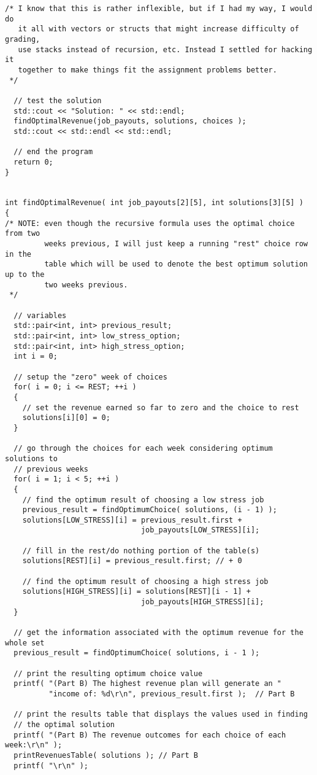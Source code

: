 \documentclass[11pts]{article}
\begin{document}
\begin{enumerate}
\begin{enumerate}
\begin{verbatim}
/* I know that this is rather inflexible, but if I had my way, I would do
   it all with vectors or structs that might increase difficulty of grading,
   use stacks instead of recursion, etc. Instead I settled for hacking it
   together to make things fit the assignment problems better.
 */

  // test the solution
  std::cout << "Solution: " << std::endl;
  findOptimalRevenue(job_payouts, solutions, choices );
  std::cout << std::endl << std::endl;

  // end the program
  return 0;
}


int findOptimalRevenue( int job_payouts[2][5], int solutions[3][5] )
{
/* NOTE: even though the recursive formula uses the optimal choice from two
         weeks previous, I will just keep a running "rest" choice row in the
         table which will be used to denote the best optimum solution up to the
         two weeks previous.
 */

  // variables
  std::pair<int, int> previous_result;
  std::pair<int, int> low_stress_option;
  std::pair<int, int> high_stress_option;
  int i = 0;

  // setup the "zero" week of choices
  for( i = 0; i <= REST; ++i )
  {
    // set the revenue earned so far to zero and the choice to rest
    solutions[i][0] = 0;
  }

  // go through the choices for each week considering optimum solutions to
  // previous weeks
  for( i = 1; i < 5; ++i )
  {
    // find the optimum result of choosing a low stress job
    previous_result = findOptimumChoice( solutions, (i - 1) );
    solutions[LOW_STRESS][i] = previous_result.first +
                               job_payouts[LOW_STRESS][i];

    // fill in the rest/do nothing portion of the table(s)
    solutions[REST][i] = previous_result.first; // + 0

    // find the optimum result of choosing a high stress job
    solutions[HIGH_STRESS][i] = solutions[REST][i - 1] +
                               job_payouts[HIGH_STRESS][i];
  }

  // get the information associated with the optimum revenue for the whole set
  previous_result = findOptimumChoice( solutions, i - 1 );

  // print the resulting optimum choice value
  printf( "(Part B) The highest revenue plan will generate an "
          "income of: %d\r\n", previous_result.first );  // Part B

  // print the results table that displays the values used in finding
  // the optimal solution
  printf( "(Part B) The revenue outcomes for each choice of each week:\r\n" );
  printRevenuesTable( solutions ); // Part B
  printf( "\r\n" );


\end{verbatim}
\end{enumerate}
\end{enumerate}
\end{document}
